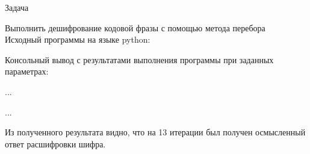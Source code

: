 \begin{center}
    Задача
\end{center}
Выполнить дешифрование кодовой фразы с помощью метода перебора\\

Исходный программы на языке python:



Консольный вывод с результатами выполнения программы при заданных параметрах:

...

...

Из полученного результата видно, что на 13 итерации был получен осмысленный ответ расшифровки шифра.
\vspace{28pt}

